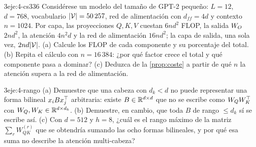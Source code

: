\begin{ejercicio}{3}{eje:4-cs336}
Considérese un modelo del tamaño de GPT-2 pequeño: $L=12$, $d=768$, vocabulario $\lvert\mathcal{V}\rvert=50\,257$, red de alimentación con $d_{ff}=4d$ y contexto $n=1024$. Por capa, las proyecciones $Q,K,V$ cuestan $6nd^{2}$ FLOP, la salida $W_{O}$ $2nd^{2}$, la atención $4n^{2}d$ y la red de alimentación $16nd^{2}$; la capa de salida, una sola vez, $2nd\lvert\mathcal{V}\rvert$. (a) Calcule los FLOP de cada componente y su porcentaje del total. (b) Repita el cálculo con $n=16\,384$: ¿por qué factor crece el total y qué componente pasa a dominar? (c) Deduzca de la \cref{prop:coste} a partir de qué $n$ la atención supera a la red de alimentación.
\end{ejercicio}

\begin{ejercicio}{3}{eje:4-rango}
(a) Demuestre que una cabeza con $d_k<d$ no puede representar una forma bilineal $x_iBx_j^{\top}$ arbitraria: existe $B\in\mathbb{R}^{d\times d}$ que no se escribe como $W_{Q}W_{K}^{\top}$ con $W_{Q},W_{K}\in\mathbb{R}^{d\times d_k}$. (b) Demuestre, en cambio, que toda $B$ de rango $\le d_k$ sí se escribe así. (c) Con $d=512$ y $h=8$, ¿cuál es el rango máximo de la matriz $\sum_{r}W_{QK}^{(r)}$ que se obtendría sumando las ocho formas bilineales, y por qué esa suma no describe la atención multi-cabeza?
\end{ejercicio}
